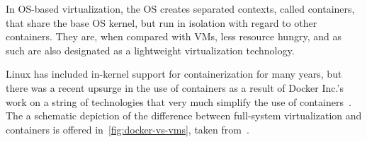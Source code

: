In OS-based virtualization, the OS creates separated contexts, called containers, that share the base OS kernel, but run in isolation with regard to other containers.
They are, when compared with VMs, less resource hungry, and as such are also designated as a lightweight virtualization technology.

Linux has included in-kernel support for containerization for many years, but there was a recent upsurge in the use of containers as a result of Docker Inc.'s work on a string of technologies that very much simplify the use of containers~\cite{hwswvirt,virtessentials}.
The a schematic depiction of the difference between full-system virtualization and containers is offered in~\ref{fig:docker-vs-vms}, taken from~\cite{dockercontreplacingvms}.







